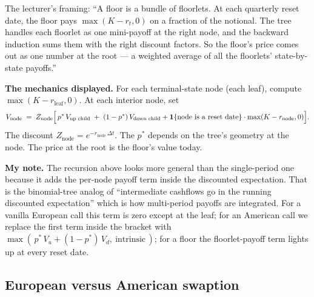 The lecturer's framing: ``A floor is a bundle of floorlets. At each
quarterly reset date, the floor pays
$\max(K - r_t, 0)$ on a fraction of the notional. The tree handles
each floorlet as one mini-payoff at the right node, and the
backward induction sums them with the right discount factors. So
the floor's price comes out as one number at the root --- a
weighted average of all the floorlets' state-by-state payoffs.''

\begin{keyblock}
\textbf{The mechanics displayed.}
For each terminal-state node (each leaf), compute
$\max(K - r_{\text{leaf}}, 0)$. At each interior node, set
\[
  V_{\text{node}}
   \;=\; Z_{\text{node}}\Bigl[\,
              p^*\,V_{\text{up child}} \;+\; (1 - p^*)\,V_{\text{down child}}
            + \mathbf{1}\{\text{node is a reset date}\}
            \cdot \max(K - r_{\text{node}}, 0)\Bigr].
\]
The discount $Z_{\text{node}} = e^{-r_{\text{node}}\,\Delta t}$. The
$p^*$ depends on the tree's geometry at the node. The price at the
root is the floor's value today.
\end{keyblock}

\begin{checkpoint}
\textbf{My note.} The recursion above looks more general than the
single-period one because it adds the per-node payoff term inside
the discounted expectation. That is the binomial-tree analog of
``intermediate cashflows go in the running discounted expectation''
which is how multi-period payoffs are integrated. For a vanilla
European call this term is zero except at the leaf; for an American
call we replace the first term inside the bracket with
$\max(\,p^*\,V_u + (1-p^*)\,V_d,\ \text{intrinsic}\,)$; for a floor
the floorlet-payoff term lights up at every reset date.
\end{checkpoint}

\subsection{European versus American swaption}\label{L8-sec:eurusdam}

